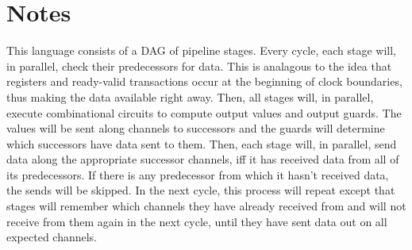 \documentclass{article}
\begin{document}
\begin{figure}[h]
\begin{syntax}
  







\end{syntax}
\end{figure}
\section{Notes}

This language consists of a DAG of pipeline stages.
Every cycle, each stage will, in parallel, check their
predecessors for data. This is analagous to the idea
that registers and ready-valid transactions occur at the beginning
of clock boundaries, thus making the data available right away.
Then, all stages will, in parallel, execute combinational circuits
to compute output values and output guards. The values will
be sent along channels to successors and the guards will determine
which successors have data sent to them.
Then, each stage will, in parallel, send data along
the appropriate successor channels, iff it has received
data from all of its predecessors. If there is any predecessor
from which it hasn't received data, the sends will be skipped.
In the next cycle, this process will repeat except that stages
will remember which channels they have already received from and
will not receive from them again in the next cycle, until they
have sent data out on all expected channels.
\end{document}
